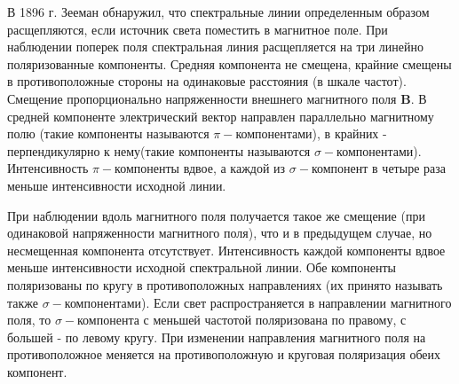 В 1896 г. Зееман обнаружил, что спектральные линии определенным образом расщепляются, если источник света поместить в магнитное поле. При наблюдении поперек поля спектральная линия расщепляется на три линейно поляризованные компоненты. Средняя компонента не смещена, крайние смещены в противоположные стороны на одинаковые расстояния (в шкале частот). Смещение пропорционально напряженности внешнего магнитного поля \textbf{B}. В средней компоненте электрический вектор направлен параллельно магнитному полю (такие компоненты называются $\pi-$компонентами), в крайних - перпендикулярно к нему(такие компоненты называются $\sigma-$компонентами). Интенсивность $\pi-$компоненты вдвое, а каждой из $\sigma-$компонент в четыре раза меньше интенсивности исходной линии. 

При наблюдении вдоль магнитного поля получается такое же смещение (при одинаковой напряженности магнитного поля), что и в предыдущем случае, но несмещенная компонента отсутствует. Интенсивность каждой компоненты вдвое меньше интенсивности исходной спектральной линии. Обе компоненты поляризованы по кругу в противоположных направлениях (их принято называть также $\sigma-$компонентами). Если свет распространяется в направлении магнитного поля, то $\sigma-$компонента с меньшей частотой поляризована по правому, с большей - по левому кругу. При изменении направления магнитного поля на противоположное меняется на противоположную и круговая поляризация обеих компонент.
 
